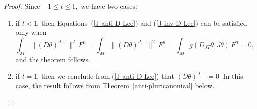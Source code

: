 \documentclass[a4paper,11pt]{amsart}
\theoremstyle{definition}
\renewcommand{\[}{\begin{equation*}}
\renewcommand{\]}{\end{equation*}}
\begin{document}
\begin{proof}
Since $-1\leq t\leq 1,$ we have two cases:
\begin{enumerate}
\item if $t<1$, then Equations~(\ref{J-anti-D-Lee})  and (\ref{J-inv-D-Lee}) can be satisfied only when $$\int_M\|\left(D\theta\right)^{J,+}\|^2\,F^n=\int_M\|\left(D\theta\right)^{J,-}\|^2\,F^n=\int_Mg(D_{JT}\theta,J\theta)\,F^n=0,$$ and the theorem follows.\\
\item if $t=1$, then we conclude from (\ref{J-anti-D-Lee}) that $\left(D\theta\right)^{J,-}=0$. In this case, the result follows from Theorem~\ref{anti-pluricanonical} below.
\end{enumerate}
\end{proof}





\end{document}
